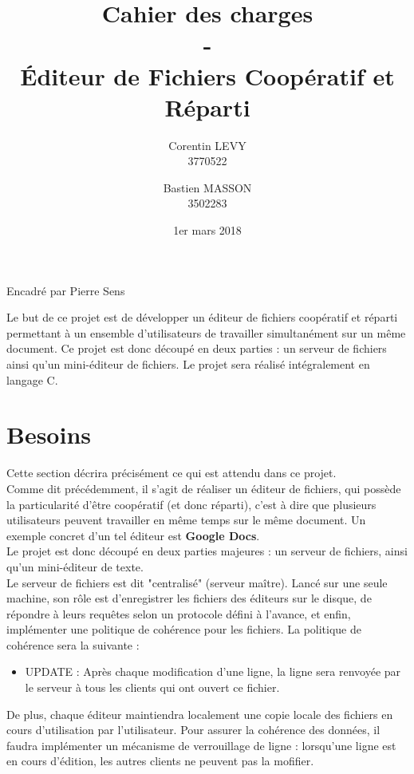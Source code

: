 \documentclass[12pt]{article}
\title{Cahier des charges\\-\\\'Editeur de Fichiers Coopératif et Réparti}
\author{Corentin LEVY\\3770522\\
		\and
		Bastien MASSON\\3502283}
\date{1er mars 2018}
\begin{document}
\begin{titlepage}

\maketitle
\begin{center}
Encadré par Pierre Sens
\end{center}

Le but de ce projet est de développer un éditeur de fichiers coopératif et réparti permettant à un ensemble d'utilisateurs de travailler simultanément sur un même document. Ce projet est donc découpé en deux parties : un serveur de fichiers ainsi qu'un mini-éditeur de fichiers. Le projet sera réalisé intégralement en langage C.

\end{titlepage}
\tableofcontents
\newpage
\section{Besoins}
Cette section décrira précisément ce qui est attendu dans ce projet.\\

Comme dit précédemment, il s'agit de réaliser un éditeur de fichiers, qui possède la particularité d'être coopératif (et donc réparti), c'est à dire que plusieurs utilisateurs peuvent travailler en même temps sur le même document. Un exemple concret d'un tel éditeur est \textbf{Google Docs}.\\

Le projet est donc découpé en deux parties majeures : un serveur de fichiers, ainsi qu'un mini-éditeur de texte.\\

Le serveur de fichiers est dit "centralisé" (serveur maître). Lancé sur une seule machine, son rôle est d'enregistrer les fichiers des éditeurs sur le disque, de répondre à leurs requêtes selon un protocole défini à l'avance, et enfin, implémenter une politique de cohérence pour les fichiers.
La politique de cohérence sera la suivante :\\
\begin{itemize}
\item UPDATE : Après chaque modification d'une ligne, la ligne sera renvoyée par le serveur à tous les clients qui ont ouvert ce fichier.\\
\end{itemize}

De plus, chaque éditeur maintiendra localement une copie locale des fichiers en cours d'utilisation par l'utilisateur. Pour assurer la cohérence des données, il faudra implémenter un mécanisme de verrouillage de ligne : lorsqu'une ligne est en cours d'édition, les autres clients ne peuvent pas la mofifier.\\
\end{document}
